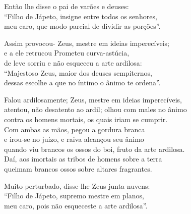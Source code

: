 \quad{}Então lhe disse o pai de varões e deuses:\\
``Filho de Jápeto, insigne entre todos os senhores,\\
meu caro, que modo parcial de dividir as porções''.

\quad{}Assim provocou- Zeus, mestre em ideias imperecíveis; \\
e a ele retrucou Prometeu curva-astúcia,\\
de leve sorriu e não esqueceu a arte ardilosa:\\
``Majestoso Zeus, maior dos deuses sempiternos,\\
dessas escolhe a que no íntimo o ânimo te ordena''.

\quad{}Falou ardilosamente; Zeus, mestre em ideias imperecíveis, \\
atentou, não desatento ao ardil; olhou com males no ânimo\\
contra os homens mortais, os quais iriam se cumprir.\\
Com ambas as mãos, pegou a gordura branca\\
e irou-se no juízo, e raiva alcançou seu ânimo\\
quando viu brancos os ossos do boi, fruto da arte ardilosa. \\
Daí, aos imortais as tribos de homens sobre a terra\\
queimam brancos ossos sobre altares fragrantes.

\quad{}Muito perturbado, disse-lhe Zeus junta-nuvens:\\
``Filho de Jápeto, supremo mestre em planos,\\
meu caro, pois não esqueceste a arte ardilosa''. 

